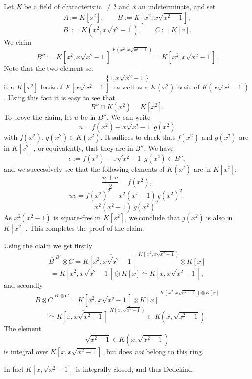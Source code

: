 \documentclass[parskip=half,fontsize=12pt]{scrartcl}%
\newcommand{\oo}{\operatorname}\newcommand{\ooo}{\operatorname*}
\begin{document}
Let $K$ be a field of characteristic $\ne2$ and $x$ an indeterminate, and set 
$$
A:=K[x^2],\qquad B:=K\left[x^2,x\sqrt{x^2-1}\right],
$$
$$
B':=K\left(x^2,x\sqrt{x^2-1}\right),\qquad C:=K[x].
$$ 
We claim 
$$
B'':=\overline{K\left[x^2,x\sqrt{x^2-1}\right]\ }^{K\left(x^2,x\sqrt{x^2-1}\right)}=K\left[x^2,x\sqrt{x^2-1}\right].
$$ 
Note that the two-element set 
$$
\{1,x\sqrt{x^2-1}\}
$$ 
is a $K[x^2]$-basis of $K[x\sqrt{x^2-1}]$, as well as a $K(x^2)$-basis of $K(x\sqrt{x^2-1})$. Using this fact it is easy to see that 
$$
B''\cap K(x^2)=K[x^2].
$$ 
To prove the claim, let $u$ be in $B''$. We can write 
$$
u=f(x^2)+x\sqrt{x^2-1}\ g(x^2)
$$ 
with $f(x^2)$, $g(x^2)\in K(x^2)$. It suffices to check that $f(x^2)$ and $g(x^2)$ are in $K[x^2]$, or equivalently, that they are in $B''$. We have 
$$
v:=f(x^2)-x\sqrt{x^2-1}\ g(x^2)\in B'',
$$ 
and we successively see that the following elements of $K(x^2)$ are in $K[x^2]$: 
$$
\frac{u+v}2=f(x^2),
$$ 
$$
uv=f(x^2)^2-x^2(x^2-1)\ g(x^2)^2,
$$ 
$$
x^2(x^2-1)\ g(x^2)^2.
$$ 
As $x^2(x^2-1)$ is square-free in $K[x^2]$, we conclude that $g(x^2)$ is also in $K[x^2]$. This completes the proof of the claim. 

Using the claim we get firstly
$$
\overline{B\ }^{B'}\otimes C=\overline{K\left[x^2,x\sqrt{x^2-1}\right]\ }^{K\left(x^2,x\sqrt{x^2-1}\right)}\otimes K[x]
$$
$$
=K\left[x^2,x\sqrt{x^2-1}\right]\otimes K[x]\simeq K\left[x,x\sqrt{x^2-1}\right],
$$ 
and secondly 
$$ 
\overline{B\otimes C\ }^{B'\otimes C}=\overline{K\left[x^2,x\sqrt{x^2-1}\right]\otimes K[x]\ }^{K\left(x^2,x\sqrt{x^2-1}\right)\otimes K[x]}
$$
$$
\simeq\overline{K\left[x,x\sqrt{x^2-1}\right]\ }^{K\left(x,\sqrt{x^2-1}\right)}\subset K\left(x,\sqrt{x^2-1}\right).
$$ 
The element 
$$
\sqrt{x^2-1}\in K\left(x,\sqrt{x^2-1}\right)
$$ 
is integral over $K\left[x,x\sqrt{x^2-1}\right]$, but does \emph{not} belong to this ring.

In fact $K\left[x,\sqrt{x^2-1}\right]$ is integrally closed, and thus Dedekind.

%
\begin{comment}
For any morphism of rings $g:A_1\to A_2$ write $\oo{IC}_{A_2}(A_1)$ for the integral closure of $A_1$ in $A_2$. Then we have, in the setting of Exercise 5.3, 
$$
\oo{IC}_{B'\otimes C}(B\otimes C)=(i\otimes1)(\oo{IC}_{B'}(B)\otimes C),
$$ 
where the tensor products are taken over $A$ and the morphism $i$ is the inclusion of $\oo{IC}_{B'}(B)$ into $B'$.

In particular, if $\phi:A\to B$ is a morphism of rings and $x$ an indeterminate, then we get 
$$
\oo{IC}_{B[x]}(A[x])=\oo{IC}_B(A)[x].
$$ 
Indeed we have $A[x]=A\otimes_{\mathbb Z}\mathbb Z[x]$, and similarly for $B$.
\end{comment}
%
\end{document}
